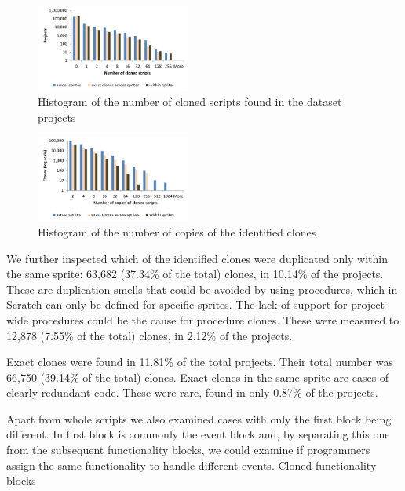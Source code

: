 \documentclass{sig-alternate}
\begin{document}
\begin{figure}
	\centering
	\includegraphics[width=0.45\textwidth]{fig/charts/11clonesprojects}
	\caption{Histogram of the number of cloned scripts found in the dataset projects}
	\label{fig:clonesprojects}
\end{figure}

\begin{figure}
	\centering
	\includegraphics[width=0.45\textwidth]{fig/charts/11clonescopies}
	\caption{Histogram of the number of copies of the identified clones}
	\label{fig:clonescopies}
\end{figure}

We further inspected which of the identified clones were duplicated only within the same sprite: 63,682 (37.34\% of the total) clones, in 10.14\% of the projects. These are duplication smells that could be avoided by using procedures, which in Scratch can only be defined for specific sprites. The lack of support for project-wide procedures could be the cause for procedure clones. These were measured to 12,878 (7.55\% of the total) clones, in 2.12\% of the projects.

Exact clones were found in 11.81\% of the total projects. Their total number was 66,750 (39.14\% of the total) clones. Exact clones in the same sprite are cases of clearly redundant code. These were rare, found in only 0.87\% of the projects.

Apart from whole scripts we also examined cases with only the first block being different. In first block is commonly the event block and, by separating this one from the subsequent functionality blocks, we could examine if programmers assign the same functionality to handle different events. Cloned functionality blocks
\end{document}
